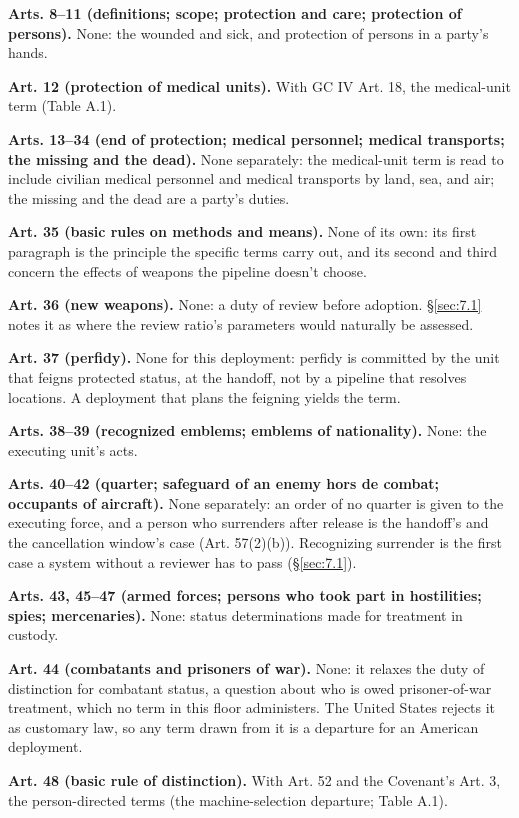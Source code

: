 \textbf{Arts. 8–11 (definitions; scope; protection and care; protection of persons).} None: the wounded and sick, and protection of persons in a party's hands.

\textbf{Art. 12 (protection of medical units).} With GC IV Art. 18, the medical-unit term (Table A.1).

\textbf{Arts. 13–34 (end of protection; medical personnel; medical transports; the missing and the dead).} None separately: the medical-unit term is read to include civilian medical personnel and medical transports by land, sea, and air; the missing and the dead are a party's duties.

\textbf{Art. 35 (basic rules on methods and means).} None of its own: its first paragraph is the principle the specific terms carry out, and its second and third concern the effects of weapons the pipeline doesn't choose.

\textbf{Art. 36 (new weapons).} None: a duty of review before adoption. \S\ref{sec:7.1} notes it as where the review ratio's parameters would naturally be assessed.

\textbf{Art. 37 (perfidy).} None for this deployment: perfidy is committed by the unit that feigns protected status, at the handoff, not by a pipeline that resolves locations. A deployment that plans the feigning yields the term.

\textbf{Arts. 38–39 (recognized emblems; emblems of nationality).} None: the executing unit's acts.

\textbf{Arts. 40–42 (quarter; safeguard of an enemy hors de combat; occupants of aircraft).} None separately: an order of no quarter is given to the executing force, and a person who surrenders after release is the handoff's and the cancellation window's case (Art. 57(2)(b)). Recognizing surrender is the first case a system without a reviewer has to pass (\S\ref{sec:7.1}).

\textbf{Arts. 43, 45–47 (armed forces; persons who took part in hostilities; spies; mercenaries).} None: status determinations made for treatment in custody.

\textbf{Art. 44 (combatants and prisoners of war).} None: it relaxes the duty of distinction for combatant status, a question about who is owed prisoner-of-war treatment, which no term in this floor administers. The United States rejects it as customary law, so any term drawn from it is a departure for an American deployment.

\textbf{Art. 48 (basic rule of distinction).} With Art. 52 and the Covenant's Art. 3, the person-directed terms (the machine-selection departure; Table A.1).

